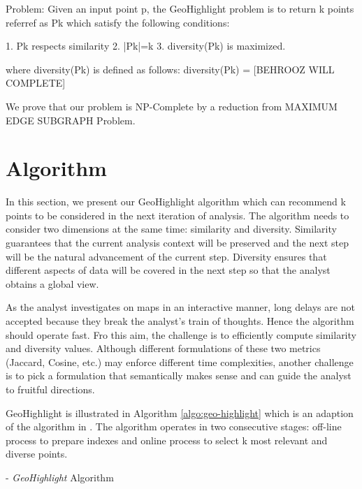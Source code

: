 \documentclass{sig-alternate-05-2015}
\begin{document}
Problem: Given an input point p, the GeoHighlight problem is to return k points referref as Pk which satisfy the following conditions:

1. Pk respects similarity
2. |Pk|=k
3. diversity(Pk) is maximized.

where diversity(Pk) is defined as follows: diversity(Pk) = [BEHROOZ WILL COMPLETE]

We prove that our problem is NP-Complete by a reduction from MAXIMUM EDGE SUBGRAPH Problem.

\section{Algorithm}\label{sec:algorithm}

In this section, we present our GeoHighlight algorithm which can recommend k
points to be considered in the next iteration of analysis. The algorithm needs
to consider two dimensions at the same time: similarity and diversity.
Similarity guarantees that the current analysis context will be preserved and
the next step will be the natural advancement of the current step. Diversity
ensures that different aspects of data will be covered in the next step so that
the analyst obtains a global view.       

As the analyst investigates on maps in an interactive manner, long delays are
not accepted because they break the analyst's train of thoughts. Hence the
algorithm should operate fast. Fro this aim, the challenge is to efficiently
compute similarity and diversity values. Although different formulations of
these two metrics (Jaccard, Cosine, etc.) may enforce different time
complexities, another challenge is to pick a formulation that semantically makes
sense and can guide the analyst to fruitful directions.      

GeoHighlight is illustrated in Algorithm \ref{algo:geo-highlight}
which is an adaption of the algorithm in \cite{Omidvar-Tehrani:2015}. The
algorithm operates in two consecutive stages: off-line process to prepare
indexes and online process to select k most relevant and diverse points.    

\begin{algorithm}
\small
\label{algo:geo-highlight}
\begin{algorithmic}
\REQUIRE
\ENSURE
\end{algorithmic}

\caption{ - \textit{GeoHighlight} Algorithm}

\end{algorithm}   
\end{document}
